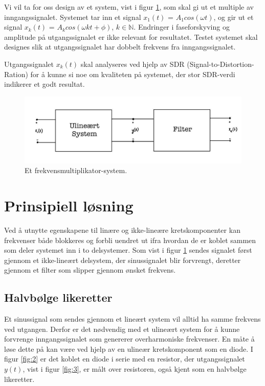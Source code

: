 \documentclass[a4paper,11pt,norsk]{article}
\begin{document}
Vi vil ta for oss design av et system, vist i figur \ref{fig:1}, som skal gi ut et multiple av inngangssignalet. Systemet tar inn et signal $x_1(t)$ = $A_1cos(\omega t)$, og gir ut et signal $x_k(t)$ = $A_kcos(\omega k t + \phi)$,  $k \in \mathbb{N}$.  
Endringer i faseforskyving og amplitude på utgangssignalet er ikke relevant for resultatet. Testet systemet skal designes slik at utgangssignalet har dobbelt frekvens fra inngangssignalet.

Utgangssignalet $x_k(t)$ skal analyseres ved hjelp av SDR (Signal-to-Distortion-Ration)
for å kunne si noe om kvaliteten på systemet, der stor SDR-verdi indikerer et godt resultat. 

\begin{figure}[H]
  \centering
  \includegraphics[scale=0.7]{D1/Images/system.jpg}
  \caption{Et frekvensmultiplikator-system.}
  \label{fig:1}
\end{figure}

\section{Prinsipiell løsning}
\label{sec:prinsipielllosning}


Ved å utnytte egenskapene til linære og ikke-lineære kretskomponenter kan frekvenser både blokkeres og forbli uendret ut ifra hvordan de er koblet sammen som deler systemet inn i to delsystemer. Som vist i figur \ref{fig:1} sendes signalet først gjennom et ikke-lineært delsystem, der sinussignalet blir forvrengt, deretter gjennom et filter som slipper gjennom ønsket frekvens. 

\subsection{Halvbølge likeretter}
\label{sub:ulineeartsystem}
Et sinussignal som sendes gjennom et lineært system vil alltid ha samme frekvens ved utgangen. Derfor er det nødvendig med et ulineært system for å kunne forvrenge inngangssignalet som genererer overharmoniske frekvenser. En måte å løse dette på kan være ved hjelp av en ulineær kretskomponent som en diode. I figur \ref{fig:2} er det koblet en diode i serie med en resistor, der utgangssignalet $y(t)$, vist i figur \ref{fig:3}, er målt over resistoren, også kjent som en halvbølge likeretter. 
\end{document}
